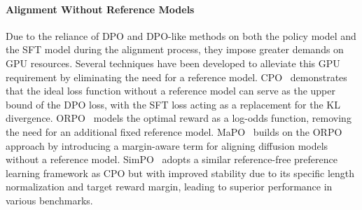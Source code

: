 \paragraph{Alignment Without Reference Models} Due to the reliance of DPO and DPO-like methods on both the policy model and the SFT model during the alignment process, they impose greater demands on GPU resources. Several techniques have been developed to alleviate this GPU requirement by eliminating the need for a reference model. CPO~\citep{xu2024contrastive} demonstrates that the ideal loss function without a reference model can serve as the upper bound of the DPO loss, with the SFT loss acting as a replacement for the KL divergence. ORPO~\citep{hong2024reference} models the optimal reward as a log-odds function, removing the need for an additional fixed reference model. MaPO~\citep{hong2024margin} builds on the ORPO approach by introducing a margin-aware term for aligning diffusion models without a reference model. SimPO~\citep{meng2024simpo} adopts a similar reference-free preference learning framework as CPO but with improved stability due to its specific length normalization and target reward margin, leading to superior performance in various benchmarks.